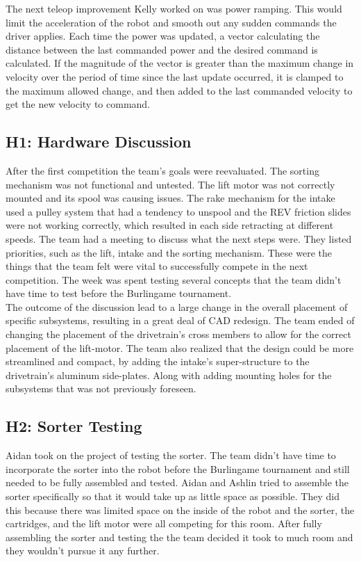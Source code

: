 \documentclass{article}
\begin{document}
The next teleop improvement Kelly worked on was power ramping. This would limit the acceleration of the robot and smooth out any sudden commands the driver applies. Each time the power was updated, a vector calculating the distance between the last commanded power and the desired command is calculated. If the magnitude of the vector is greater than the maximum change in velocity over the period of time since the last update occurred, it is clamped to the maximum allowed change, and then added to the last commanded velocity to get the new velocity to command. 
\subsection{H1: Hardware Discussion}

After the first competition the team's goals were reevaluated. The sorting mechanism was not functional and untested. The lift motor was not correctly mounted and its spool was causing issues. The rake mechanism for the intake used a pulley system that had a tendency to unspool and the REV friction slides were not working correctly, which resulted in each side retracting at different speeds. The team had a meeting to discuss what the next steps were. They listed priorities, such as the lift, intake and the sorting mechanism. These were the things that the team felt were vital to successfully compete in the next competition. The week was spent testing several concepts that the team didn't have time to test before the Burlingame tournament. \\

The outcome of the discussion lead to a large change in the overall placement of specific subsystems, resulting in a great deal of CAD redesign. The team ended of changing the placement of the drivetrain's cross members to allow for the correct placement of the lift-motor. The team also realized that the design could be more streamlined and compact, by adding the intake's super-structure to the drivetrain's aluminum side-plates. Along with adding mounting holes for the subsystems that was not previously foreseen.  \\


\subsection{H2: Sorter Testing}

Aidan took on the project of testing the sorter. The team didn't have time to incorporate the sorter into the robot before the Burlingame tournament and still needed to be fully assembled and tested. Aidan and Ashlin tried to assemble the sorter specifically so that it would take up as little space as possible. They did this because there was limited space on the inside of the robot and the sorter, the cartridges, and the lift motor were all competing for this room. After fully assembling the sorter and testing the the team decided it took to much room and they wouldn't pursue it any further.
\end{document}
